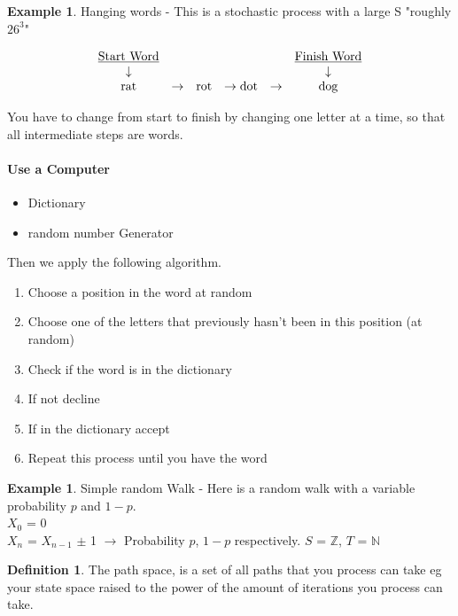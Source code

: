 \documentclass{article}
\theoremstyle{definition}
\newtheorem{defn}[thm]{Definition}
\newtheorem{ex}[thm]{Example}
\begin{document}
\begin{ex}
Hanging words - This is a stochastic process with a large S "roughly $26^3$"

\[
\begin{array}{ccccccc}
\mbox{\underline{Start Word}} & & & & & \mbox{\underline{Finish Word}} \\
\downarrow & & & & & \downarrow \\
\mbox{rat} & \rightarrow & \mbox{rot} & \rightarrow \mbox{dot} & \rightarrow & \mbox{dog}
\end{array}
\]

You have to change from start to finish by changing one letter at a time, so that all intermediate steps are words.
\end{ex}

\paragraph*{Use a Computer}

\begin{itemize}
\item
Dictionary
\item
random number Generator
\end{itemize}

Then we apply the following algorithm.

\begin{enumerate}
\item
Choose a position in the word at random
\item
Choose one of the letters that previously hasn't been in this position (at random)
\item
Check if the word is in the dictionary
\item
If not decline
\item
If in the dictionary accept
\item
Repeat this process until you have the word
\end{enumerate}

\begin{ex}Simple random Walk - Here is a random walk with a variable probability $p$ and $1-p$.\\

$X_0$ = 0\\
$X_n$ = $X_{n-1}$ $\pm$ 1 $\rightarrow$ Probability $p$, $1-p$ respectively.
\indent $S$ = $\mathbb{Z}$, $T$ = $\mathbb{N}$
\end{ex}

\begin{defn} The path space, is a set of all paths that you process can take eg your state space raised to the power of the amount of iterations you process can take.
\end{defn}
\end{document}
